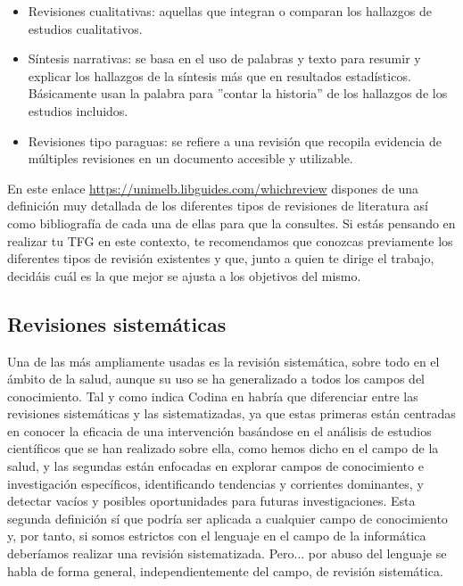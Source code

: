 \begin{itemize}
\begin{itemize}
        \item Revisiones cualitativas: aquellas que integran o comparan los hallazgos de estudios cualitativos.
        
        \item Síntesis narrativas: se basa en el uso de palabras y texto para resumir y explicar los hallazgos de la síntesis más que en resultados estadísticos. Básicamente usan la palabra para ''contar la historia'' de los hallazgos de los estudios incluidos.

        \item Revisiones tipo paraguas: se refiere a una revisión que recopila evidencia de múltiples revisiones en un documento accesible y utilizable. 
        
    \end{itemize}
\end{itemize}

En este enlace \url{https://unimelb.libguides.com/whichreview} dispones de una definición muy detallada de los diferentes tipos de revisiones de literatura así como bibliografía de cada una de ellas para que la consultes. Si estás pensando en realizar tu TFG en este contexto, te recomendamos que conozcas previamente los diferentes tipos de revisión existentes y que, junto a quien te dirige el trabajo, decidáis cuál es la que mejor se ajusta a los objetivos del mismo.

\subsection{Revisiones sistemáticas}

Una de las más ampliamente usadas es la revisión sistemática, sobre todo en el ámbito de la salud, aunque su uso se ha generalizado a todos los campos del conocimiento. Tal y como indica Codina en \cite{codina2018lluis} habría que diferenciar entre las revisiones sistemáticas y las sistematizadas, ya que estas primeras están centradas en conocer la eficacia de una intervención basándose en el análisis de estudios científicos que se han realizado sobre ella, como hemos dicho en el campo de la salud, y las segundas están enfocadas en explorar campos de conocimiento e investigación específicos, identificando  tendencias y corrientes dominantes, y detectar vacíos y posibles oportunidades para futuras investigaciones. Esta segunda definición sí que podría ser aplicada a cualquier campo de conocimiento y, por tanto, si somos estrictos con el lenguaje en el campo de la informática deberíamos realizar una revisión sistematizada. Pero... por abuso del lenguaje se habla de forma general, independientemente del campo, de revisión sistemática. 

